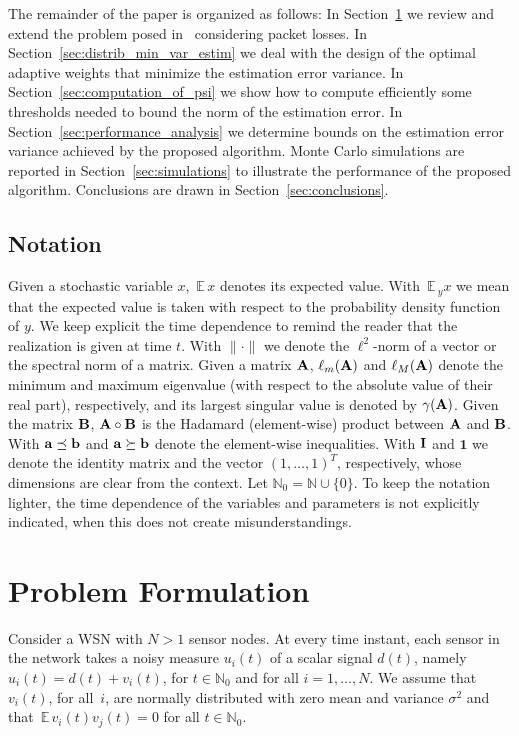 \documentclass[a4paper,notitlepage,onecolumn]{article}
\def\1{\mathbf{1}}
\def\N{\mathds{N}}
\def\I{{\cal I}}
\def\a{{\bf a}}
\def\b{{\bf b}}
\def\b{{\bf b}}
\def\I{{\bf I}}
\def\A{{\bf A}}
\def\B{{\bf B}}
\def\E{\,\mathds{E}\,}
\numberwithin{equation}{section}
\begin{document}
The remainder of the paper is organized as follows: In
Section~\ref{sec:problem_formulation} we review and extend the
problem posed in~\cite{JSAC07} considering packet losses. In
Section~\ref{sec:distrib_min_var_estim} we deal with the design of
the optimal adaptive weights that minimize the estimation error
variance. In Section~\ref{sec:computation_of_psi} we show how to
compute efficiently some thresholds needed to bound the norm of
the estimation error. In Section~\ref{sec:performance_analysis} we
determine bounds on the estimation error variance achieved by the
proposed algorithm. Monte Carlo simulations are reported in
Section~\ref{sec:simulations} to illustrate the performance of the
proposed algorithm. Conclusions are drawn in
Section~\ref{sec:conclusions}.





\subsection{Notation}
\label{subsection:notation} Given a stochastic variable $x$, $\E
x$ denotes its expected value. With $\E_y x$ we mean that the
expected value is taken with respect to the probability density
function of $y$.  We keep
explicit the time dependence to remind the reader that the
realization is given at time $t$. With $\|\cdot\|$ we denote the
$\ell^2$-norm of a vector or the spectral norm of a matrix. Given
a matrix $\A$, $\ell_{m}(\A)$ and $\ell_{M}(\A)$ denote the
minimum and maximum eigenvalue (with respect to the absolute value
of their real part), respectively, and its largest singular value
is denoted by ${\gamma}(\A)$. Given the matrix $\B$, $\A \circ \B$
is the Hadamard (element-wise) product between $\A$ and $\B$. With
$\a \preceq \b$ and $\a \succeq \b$ denote the element-wise
inequalities. With $\I$ and $\1$ we denote the identity matrix and
the vector $(1,\dots,1)^T$, respectively, whose dimensions are
clear from the context. Let $\N_0=\N\cup\{0\}$. To keep the
notation lighter, the time dependence of the variables and
parameters is not explicitly indicated, when this does not create
misunderstandings.

\section{Problem Formulation}
\label{sec:problem_formulation}

Consider a WSN with $N>1$ sensor nodes. At every time instant,
each sensor in the network takes a noisy measure $u_i(t)$ of a
scalar signal $d(t)$, namely $u_i(t)=d(t)+v_i(t)$, for $t\in\N_0$
and for all $i=1,\dots,N$. We assume that $v_i(t)$, for all~$i$,
are normally distributed with zero mean and variance $\sigma^2$
and that $\E v_i(t) v_j(t)=0$ for all $t\in\N_0$.
\end{document}

